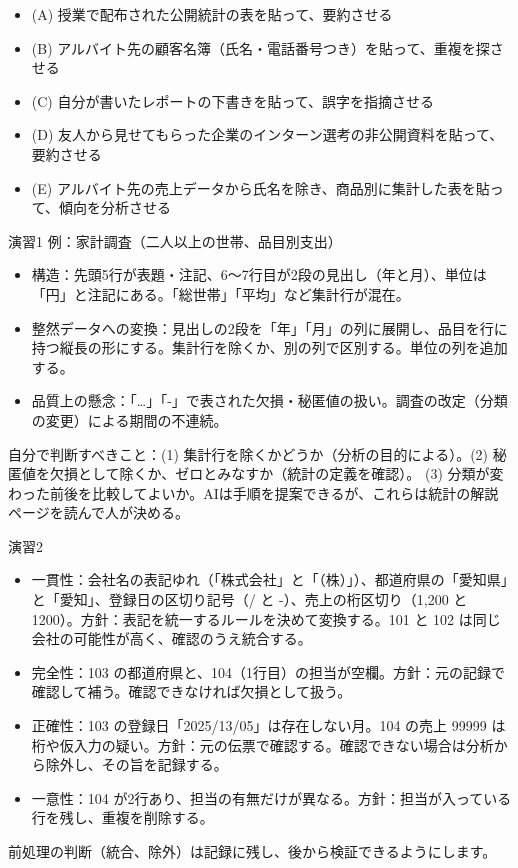 \begin{itemize}
  \item (A) 授業で配布された公開統計の表を貼って、要約させる
  \item (B) アルバイト先の顧客名簿（氏名・電話番号つき）を貼って、重複を探させる
  \item (C) 自分が書いたレポートの下書きを貼って、誤字を指摘させる
  \item (D) 友人から見せてもらった企業のインターン選考の非公開資料を貼って、要約させる
  \item (E) アルバイト先の売上データから氏名を除き、商品別に集計した表を貼って、傾向を分析させる
\end{itemize}


\begin{answer}{演習1}
例：家計調査（二人以上の世帯、品目別支出）
\begin{itemize}
  \item 構造：先頭5行が表題・注記、6〜7行目が2段の見出し（年と月）、単位は「円」と注記にある。「総世帯」「平均」など集計行が混在。
  \item 整然データへの変換：見出しの2段を「年」「月」の列に展開し、品目を行に持つ縦長の形にする。集計行を除くか、別の列で区別する。単位の列を追加する。
  \item 品質上の懸念：「…」「-」で表された欠損・秘匿値の扱い。調査の改定（分類の変更）による期間の不連続。
\end{itemize}
自分で判断すべきこと：(1) 集計行を除くかどうか（分析の目的による）。(2) 秘匿値を欠損として除くか、ゼロとみなすか（統計の定義を確認）。
(3) 分類が変わった前後を比較してよいか。AIは手順を提案できるが、これらは統計の解説ページを読んで人が決める。
\end{answer}

\begin{answer}{演習2}
\begin{itemize}
  \item 一貫性：会社名の表記ゆれ（「株式会社」と「（株）」）、都道府県の「愛知県」と「愛知」、登録日の区切り記号（/ と -）、売上の桁区切り（1,200 と 1200）。方針：表記を統一するルールを決めて変換する。101 と 102 は同じ会社の可能性が高く、確認のうえ統合する。
  \item 完全性：103 の都道府県と、104（1行目）の担当が空欄。方針：元の記録で確認して補う。確認できなければ欠損として扱う。
  \item 正確性：103 の登録日「2025/13/05」は存在しない月。104 の売上 99999 は桁や仮入力の疑い。方針：元の伝票で確認する。確認できない場合は分析から除外し、その旨を記録する。
  \item 一意性：104 が2行あり、担当の有無だけが異なる。方針：担当が入っている行を残し、重複を削除する。
\end{itemize}
前処理の判断（統合、除外）は記録に残し、後から検証できるようにします。
\end{answer}

